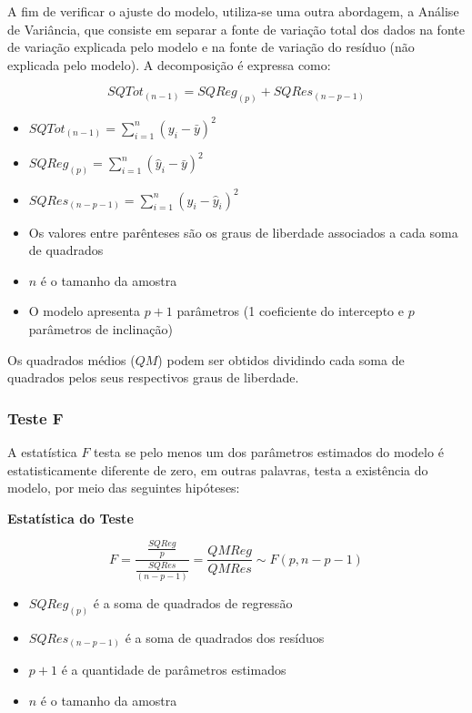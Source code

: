 \documentclass[
  portuguese,
]{estat/estat}
\providecommand{\tightlist}{%
  \setlength{\itemsep}{0pt}\setlength{\parskip}{0pt}}
\begin{document}
A fim de verificar o ajuste do modelo, utiliza-se uma outra abordagem, a
Análise de Variância, que consiste em separar a fonte de variação total
dos dados na fonte de variação explicada pelo modelo e na fonte de
variação do resíduo (não explicada pelo modelo). A decomposição é
expressa como:

\[
SQTot_{(n-1)}=SQReg_{(p)}+SQRes_{(n-p-1)}
\]

\begin{itemize}
\tightlist
\item
  \(SQTot_{(n-1)}=\displaystyle\sum_{i=1}^n{(y_i-\bar{y})^2}\)
\item
  \(SQReg_{(p)}=\displaystyle\sum_{i=1}^n{(\hat{y}_i-\bar{y})^2}\)
\item
  \(SQRes_{(n-p-1)}=\displaystyle\sum_{i=1}^n{(y_i-\hat{y}_i)^2}\)
\item
  Os valores entre parênteses são os graus de liberdade associados a
  cada soma de quadrados
\item
  \(n\) é o tamanho da amostra
\item
  O modelo apresenta \(p+1\) parâmetros (1 coeficiente do intercepto e
  \(p\) parâmetros de inclinação)
\end{itemize}

Os quadrados médios (\(QM\)) podem ser obtidos dividindo cada soma de
quadrados pelos seus respectivos graus de liberdade.

\subsubsection{Teste F}\label{teste-f}

A estatística \(F\) testa se pelo menos um dos parâmetros estimados do
modelo é estatisticamente diferente de zero, em outras palavras, testa a
existência do modelo, por meio das seguintes hipóteses:


\textbf{Estatística do Teste}

\[
F = \frac{\frac{SQReg}{p}}{\frac{SQRes}{(n-p-1)}} = \frac{QMReg}{QMRes} \sim F(p, n-p-1)
\]

\begin{itemize}
\tightlist
\item
  \(SQReg_{(p)}\) é a soma de quadrados de regressão
\item
  \(SQRes_{(n-p-1)}\) é a soma de quadrados dos resíduos
\item
  \(p+1\) é a quantidade de parâmetros estimados
\item
  \(n\) é o tamanho da amostra
\end{itemize}
\end{document}
